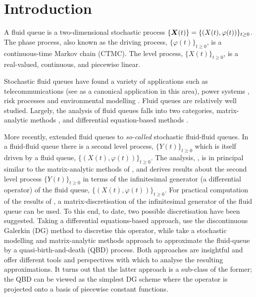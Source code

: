 \chapter{Introduction \label{ch:intro}} 
A fluid queue is a two-dimensional stochastic process \(\{\boldsymbol X(t)\} = \{(X(t),\varphi(t))\}_{t\geq0}\). The phase process, also known as the driving process, \(\{\varphi(t)\}_{t\geq0}\), is a continuous-time Markov chain (CTMC). The level process, \(\{X(t)\}_{t\geq0}\), is a real-valued, continuous, and piecewise linear. 

Stochastic fluid queues have found a variety of applications such as telecommunications (see \cite{anick1982} as a canonical application in this area), power systems \citep{hydro}, risk processes \citep{betal2005} and environmental modelling \citep{wurm2020}. Fluid queues are relatively well studied. Largely, the analysis of fluid queues falls into two categories, matrix-analytic methods \citep{ajr2005,ar2003,ar2004,bean2005b,bean2005,bot08,bean2009,dasilva2005,latouche2018}, and differential equation-based methods \citep{anick1982,kk1995,beanetal2019}. %

More recently, \cite{bo2014} extended fluid queues to \emph{so-called} stochastic fluid-fluid queues. In a fluid-fluid queue there is a second level process, \(\{Y(t)\}_{t\geq0}\) which is itself driven by a fluid queue, \(\{(X(t),\varphi(t))\}_{t\geq0}\). The analysis,  \citep{bo2014}, is in principal similar to the matrix-analytic methods of \citep{bean2005}, and derives results about the second level process \(\{Y(t)\}_{t\geq0}\) in terms of the infinitesimal generator (a differential operator) of the fluid queue, \(\{(X(t),\varphi(t))\}_{t\geq0}\). For practical computation of the results of \cite{bo2014}, a matrix-discretisation of the infinitesimal generator of the fluid queue can be used. To this end, to date, two possible discretisation have been suggested. Taking a differential equations-based approach, \cite{beanetal2019} use the discontinuous Galerkin (DG) method to discretise this operator, while \cite{bo2013} take a stochastic modelling and matrix-analytic methods approach to approximate the fluid-queue by a quasi-birth-and-death (QBD) process. Both approaches are insightful and offer different tools and perspectives with which to analyse the resulting approximations. It turns out that the latter approach is a sub-class of the former; the QBD can be viewed as the simplest DG scheme where the operator is projected onto a basis of piecewise constant functions.

